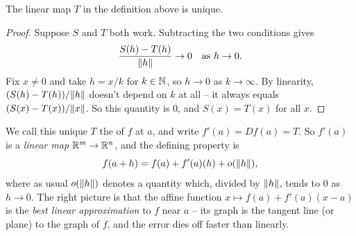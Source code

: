 \documentclass[a4paper]{scrartcl}
\begin{document}
\begin{proposition}
    The linear map $T$ in the definition above is unique.
\end{proposition}
\begin{proof}
    Suppose $S$ and $T$ both work. Subtracting the two conditions gives
    $$
    \frac{S(h) - T(h)}{\norm{h}} \rightarrow 0 \quad \text{as } h \rightarrow 0.
    $$
    Fix $x \neq 0$ and take $h = x/k$ for $k \in \mathbb{N}$, so $h \rightarrow 0$ as $k \rightarrow \infty$. By linearity, $(S(h) - T(h))/\norm{h}$ doesn't depend on $k$ at all -- it always equals $(S(x) - T(x))/\norm{x}$. So this quantity is $0$, and $S(x) = T(x)$ for all $x$.
\end{proof}

We call this unique $T$ the  of $f$ at $a$, and write $f'(a) = Df(a) = T$. So $f'(a)$ is a \emph{linear map} $\mathbb{R}^m \rightarrow \mathbb{R}^n$, and the defining property is
$$
f(a + h) = f(a) + f'(a)(h) + o(\norm{h}),
$$
where as usual $o(\norm{h})$ denotes a quantity which, divided by $\norm{h}$, tends to $0$ as $h \rightarrow 0$. The right picture is that the affine function $x \mapsto f(a) + f'(a)(x - a)$ is the \emph{best linear approximation} to $f$ near $a$ -- its graph is the tangent line (or plane) to the graph of $f$, and the error dies off faster than linearly.

\begin{center}
\end{center}
\end{document}
